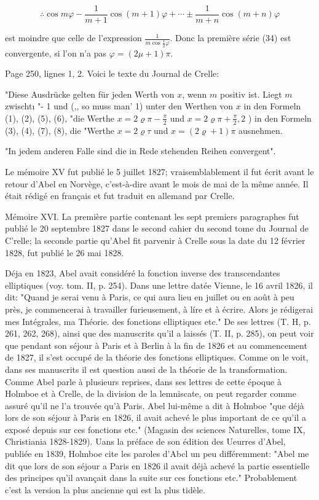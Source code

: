 \documentclass{article}
\begin{document}
\[
\therefore \cos m \varphi-\frac{1}{m+1} \cos (m+1) \varphi+\cdots \pm \frac{1}{m+n} \cos (m+n) \varphi
\]

est moindre que celle de l'expression \(\frac{1}{m \cos \frac{1}{2} \varphi}\). Donc la première série (34) est convergente, si l'on n'a pas \(\varphi=(2 \mu+1) \pi\).

Page 250, lignes 1, 2. Voici le texte du Journal de Crelle:

"Diese Ausdrücke gelten für jeden Werth von \(x\), wenn \(m\) positiv ist. Liegt \(m\) zwischtı "- 1 und (,, so muss man' 1) unter den Werthen von \(x\) in den Formeln (1), (2), (5), (6), "die Werthe \(x=2 \varrho \pi-\frac{\pi}{2}\) und \(x=2 \varrho \pi+\frac{\pi}{2}, 2\) ) in den Formeln (3), (4), (7), (8), die "Werthe \(x=2 \varrho \tau\) und \(x=(2 \varrho+1) \pi\) ausnehmen.

"In jedem anderen Falle sind die in Rede stehenden Reihen convergent".

Le mémoire \(\mathrm{XV}\) fut publié le 5 juillet 1827; vraisemblablement il fut écrit avant le retour d'Abel en Norvège, c'est-à-dire avant le mois de mai de la même année. Il était rédigé en français et fut traduit en allemand par Crelle.

Mémoire XVI. La première partie contenant les sept premiers paragraphes fut publié le 20 septembre 1827 dans le second cahier du second tome du Journal de C'relle; la seconde partie qu'Abel fit parvenir à Crelle sous la date du 12 février 1828, fut publié le 26 mai 1828.

Déja en 1823, Abel avait considéré la fonction inverse des transcendantes elliptiques (voy. tom. II, p. 254). Dans une lettre datée Vienne, le 16 avril 1826, il dit: "Quand je serai venu à Paris, ce qui aura lieu en juillet ou en août à peu près, je commencerai à travailler furieusement, à líre et à écrire. Alors je rédigerai mes Intégrales, ma Théorie. des fonctions elliptiques etc." De ses lettres (T. H, p. 261, 262, 268), ainsi que des manuscrits qu'il a laissés (T. II, p. 285), on peut voir que pendant son séjour à Paris et à Berlin à la fin de 1826 et au commencement de 1827, il s'est occupé de la théorie des fonctions elliptiques. Comme on le voit, dans ses manuscrits il est question aussi de la théorie de la transformation. Comme Abel parle à plusieurs reprises, dans ses lettres de cette époque à Holmboe et à Crelle, de la division de la lemniscate, on peut regarder comme assuré qu'il ne l'a trouvée qu'à Paris. Abel lui-même a dit à Holmboe "que déjà lors de son séjour à Paris en 1826, il avait achevé le plus important de ce qu'il a exposé depuis sur ces fonctions etc." (Magasin des sciences Naturelles, tome IX, Christiania 1828-1829). Uans la préface de son édition des Ueurres d'Abel, publiée en 1839, Holmboe cite les paroles d'Abcl un peu différemment: "Abel me dit que lors de son séjour a Paris en 1826 il avait déjà achevé la partie essentielle des principes qu'il avançait dans la suite sur ces fonctions etc." Probablement c'est la version la plus ancienne qui est la plus tidèle.
\end{document}
